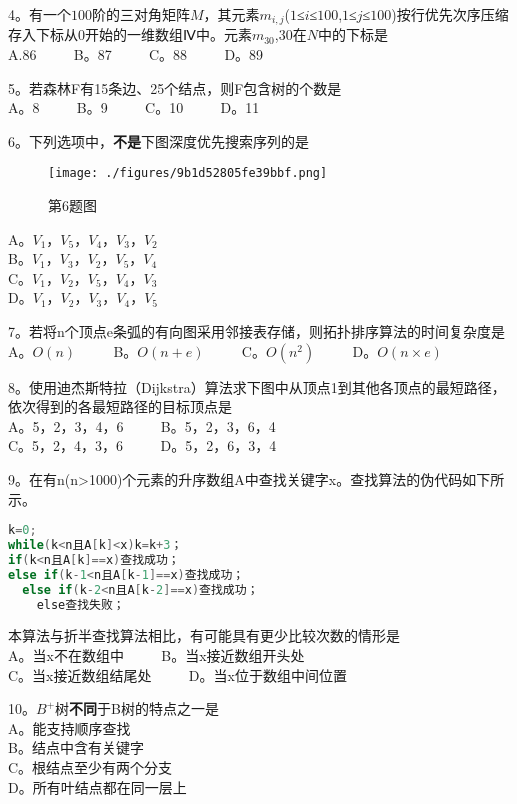 4。有一个$100$阶的三对角矩阵$M$，其元素$m_{i,j}$($1$≤$i$≤$100$,$1$≤$j$≤$100$)按行优先次序压缩存入下标从$0$开始的一维数组Ⅳ中。元素$m_{30}$,$30$在$N$中的下标是 \\
A.86 $\qquad$ B。87 $\qquad$ C。88 $\qquad$ D。89

5。若森林F有15条边、25个结点，则F包含树的个数是 \\
A。8 $\qquad$ B。9 $\qquad$ C。10 $\qquad$ D。11

6。下列选项中，\textbf{不是}下图深度优先搜索序列的是 \\
\begin{figure}[ht]
\centering
\texttt{[image: ./figures/9b1d52805fe39bbf.png]}
\caption{第6题图} \label{fig_CSN16_2}
\end{figure}
A。$V_1$，$V_5$，$V_4$，$V_3$，$V_2$ \\
B。$V_1$，$V_3$，$V_2$，$V_5$，$V_4$ \\
C。$V_1$，$V_2$，$V_5$，$V_4$，$V_3$ \\
D。$V_1$，$V_2$，$V_3$，$V_4$，$V_5$

7。若将n个顶点e条弧的有向图采用邻接表存储，则拓扑排序算法的时间复杂度是 \\
A。$O(n)$ $\qquad$ B。$O(n+e)$ $\qquad$ C。$O(n^2)$ $\qquad$ D。$O(n\times e)$

8。使用迪杰斯特拉（Dijkstra）算法求下图中从顶点1到其他各顶点的最短路径，依次得到的各最短路径的目标顶点是 \\
A。5，2，3，4，6 $\qquad$ B。5，2，3，6，4 \\
C。5，2，4，3，6 $\qquad$ D。5，2，6，3，4

9。在有n(n>1000)个元素的升序数组A中查找关键字x。查找算法的伪代码如下所示。 \\
\begin{lstlisting}[language=cpp]
k=0;
while(k<n且A[k]<x)k=k+3；
if(k<n且A[k]==x)查找成功；
else if(k-1<n且A[k-1]==x)查找成功；
  else if(k-2<n且A[k-2]==x)查找成功；
    else查找失败；
\end{lstlisting}
本算法与折半查找算法相比，有可能具有更少比较次数的情形是 \\
A。当x不在数组中 $\qquad$ B。当x接近数组开头处 \\
C。当x接近数组结尾处 $\qquad$ D。当x位于数组中间位置

10。$B^+$树\textbf{不同}于B树的特点之一是 \\
A。能支持顺序查找 \\
B。结点中含有关键字 \\
C。根结点至少有两个分支 \\
D。所有叶结点都在同一层上

